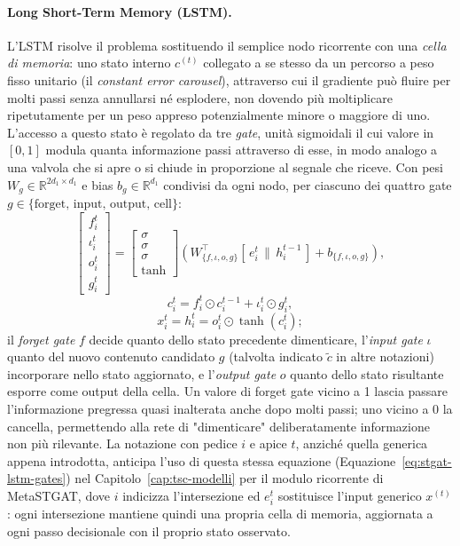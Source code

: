 \paragraph{Long Short-Term Memory (LSTM).} L'LSTM \citep{lipton2015rnnreview}
risolve il problema sostituendo il semplice nodo ricorrente con una
\emph{cella di memoria}: uno stato interno $c^{(t)}$ collegato a se stesso
da un percorso a peso fisso unitario (il \emph{constant error carousel}),
attraverso cui il gradiente può fluire per molti passi senza annullarsi né
esplodere, non dovendo più moltiplicare ripetutamente per un peso appreso
potenzialmente minore o maggiore di uno. L'accesso a questo stato è
regolato da tre \emph{gate}, unità sigmoidali il cui valore in $[0,1]$
modula quanta informazione passi attraverso di esse, in modo analogo a una
valvola che si apre o si chiude in proporzione al segnale che riceve. Con
pesi $W_g \in \mathbb{R}^{2d_1 \times d_1}$ e bias $b_g \in
\mathbb{R}^{d_1}$ condivisi da ogni nodo, per ciascuno dei quattro gate
$g \in \{\text{forget, input, output, cell}\}$:
\begin{equation}
  \begin{bmatrix} f_i^t \\ \iota_i^t \\ o_i^t \\ g_i^t \end{bmatrix} =
  \begin{bmatrix} \sigma \\ \sigma \\ \sigma \\ \tanh \end{bmatrix}
  \left(
  W_{\{f,\iota,o,g\}}^{\top} [\,e_i^t \,\|\, h_i^{t-1}\,] + b_{\{f,\iota,o,g\}}
  \right),
  \label{eq:lstm-background-gates}
\end{equation}
\[ c_i^t = f_i^t \odot c_i^{t-1} + \iota_i^t \odot g_i^t, \]
\[ x_i^t = h_i^t = o_i^t \odot \tanh(c_i^t); \]
il \emph{forget gate} $f$ decide quanto dello stato precedente
dimenticare, l'\emph{input gate} $\iota$ quanto del nuovo contenuto
candidato $g$ (talvolta indicato $\tilde c$ in altre notazioni) incorporare
nello stato aggiornato, e l'\emph{output gate} $o$ quanto dello stato
risultante esporre come output della cella. Un valore di forget gate
vicino a 1 lascia passare l'informazione pregressa quasi inalterata anche
dopo molti passi; uno vicino a 0 la cancella, permettendo alla rete di
"dimenticare" deliberatamente informazione non più rilevante. La
notazione con pedice $i$ e apice $t$, anziché quella generica appena
introdotta, anticipa l'uso di questa stessa equazione
(Equazione~\ref{eq:stgat-lstm-gates}) nel Capitolo~\ref{cap:tsc-modelli}
per il modulo ricorrente di MetaSTGAT, dove $i$ indicizza l'intersezione
ed $e_i^t$ sostituisce l'input generico $x^{(t)}$: ogni intersezione
mantiene quindi una propria cella di memoria, aggiornata a ogni passo
decisionale con il proprio stato osservato.

